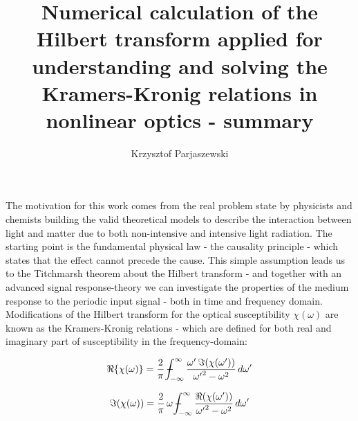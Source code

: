 \documentclass{article}
\title{Numerical calculation of the Hilbert transform applied for
understanding and solving the Kramers-Kronig relations in nonlinear
optics - summary}
\author{Krzysztof Parjaszewski}
\date{}
\def\Xint#1{\mathchoice
{\XXint\displaystyle\textstyle{#1}}%
{\XXint\textstyle\scriptstyle{#1}}%
{\XXint\scriptstyle\scriptscriptstyle{#1}}%
{\XXint\scriptscriptstyle\scriptscriptstyle{#1}}%
\!\int}
\def\XXint#1#2#3{{\setbox0=\hbox{$#1{#2#3}{\int}$ }
\vcenter{\hbox{$#2#3$ }}\kern-.6\wd0}}
\def\dashint{\Xint-}
\begin{document}
\maketitle
\paragraph{}
The motivation for this work comes from the real problem state by
physicists and chemists building the valid theoretical models to
describe the interaction between light and matter due to both
non-intensive and intensive light radiation. The starting point is the
fundamental physical law - the causality principle - which states that
the effect cannot precede the cause. This simple assumption leads us
to the Titchmarsh theorem about the Hilbert transform - and together with
an advanced signal response-theory we can investigate the properties of
the medium response to the periodic input signal - both in time and
frequency domain. Modifications of the Hilbert transform for the
optical susceptibility $\chi(\omega)$ are known as the Kramers-Kronig relations - which are defined for
both real and imaginary part of susceptibility in the frequency-domain:

$$\Re \{ \chi (\omega ) \}=\frac {2}{\pi} \,\dashint _{ - \infty }^{\infty }
\frac {\omega^{\prime} \,\Im (\chi (\omega^{\prime} ))}{{\omega^{\prime}} ^{2} - \omega ^{2}}
\,d \omega^{\prime}  $$


$$\Im (\chi (\omega ))=\frac {2}{\pi}\,\omega \,\dashint _{ - \infty }^{
\infty }\frac {\Re (\chi (\omega^{\prime} ))}{{\omega^{\prime}} ^{2} - \omega ^{2}}\,
d\omega^{\prime}  $$
\end{document}
